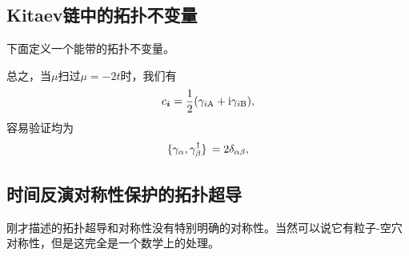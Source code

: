 \subsection{Kitaev链中的拓扑不变量}

下面定义一个能带的拓扑不变量。

总之，当$\mu$扫过$\mu=-2t$时，我们有
\[
    {c}_{\vb*{i}} = \frac{1}{2} ({\gamma}_{i\text{A}} + \mathrm{i} {\gamma}_{i \text{B}}),
\]
容易验证均为
\begin{equation}
    \acomm*{{\gamma}_\alpha}{{\gamma}_\beta^\dagger} = 2 \delta_{\alpha \beta},
\end{equation}

\subsection{时间反演对称性保护的拓扑超导}

刚才描述的拓扑超导和对称性没有特别明确的对称性。当然可以说它有粒子-空穴对称性，但是这完全是一个数学上的处理。
